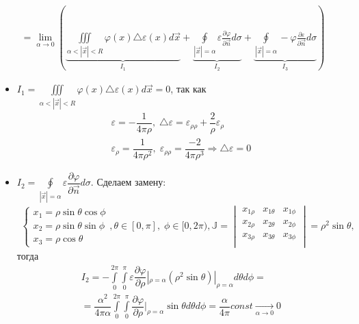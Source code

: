 \begin{Proof}
$$\begin{gathered}
		= \lim_{\alpha \to 0} \left(\underbrace{\iiint \limits_{\alpha < |\vec{x}| < R} \varphi (x) \triangle \varepsilon (x) d \vec{x}}_{I_1} + \underbrace{\oint \limits_{|\vec{x}| = \alpha} \varepsilon \frac{\partial \varphi}{\partial \vec{n}} d \sigma}_{I_2} + \underbrace{\oint \limits_{|\vec{x}| = \alpha}  -\varphi \frac{\partial \varepsilon}{\partial \vec{n}} d \sigma}_{I_3} \right)
	\end{gathered}$$
	\begin{itemize}
		\item $I_1 = \iiint \limits_{\alpha < |\vec{x}| < R} \varphi (x) \triangle \varepsilon (x) d \vec{x} = 0$, так как 
		$$\begin{gathered}
			\varepsilon = -\dfrac{1}{4\pi \rho}, \; \triangle\varepsilon = \varepsilon_{\rho\rho} + \dfrac{2}{\rho}\varepsilon_{\rho} \\
			\varepsilon_{\rho} = \dfrac{1}{4\pi\rho^2}, \; \varepsilon_{\rho\rho} = \dfrac{-2}{4\pi\rho^3} \Longrightarrow \triangle\varepsilon = 0
		\end{gathered}$$
		\item $I_2 = \oint \limits_{|\vec{x}| = \alpha} \varepsilon \dfrac{\partial \varphi}{\partial \vec{n}}d\sigma $. Сделаем замену:
		$$\begin{gathered}
			\begin{cases}		
				x_1 = \rho \sin\theta\cos\phi \\	
				x_2 = \rho \sin\theta\sin\phi \\	
				x_3 = \rho \cos\theta
			\end{cases},  \theta \in [0, \pi], \; \phi \in [0, 2\pi), 
			\mathbb{J} = 
			\begin{vmatrix}
				x_{1\rho} & x_{1\theta} & x_{1\phi}  \\
				x_{2\rho} & x_{2\theta} & x_{2\phi}  \\
				x_{3\rho} & x_{3\theta} & x_{3\phi}  \\
			\end{vmatrix} =
			\rho^2\sin\theta,
		\end{gathered}$$
		тогда
		$$\begin{gathered}
			I_2 = -\int\limits_{0}^{2\pi} \int\limits_{0}^{\pi} \varepsilon \dfrac{\partial \varphi}{\partial \rho}|_{\rho = \alpha}(\rho^2\sin\theta)
			|_{\rho = \alpha} d\theta d\phi = \\
			= \dfrac{\alpha^2}{4\pi\alpha} \int\limits_{0}^{2\pi} \int\limits_{0}^{\pi}  \dfrac{\partial \varphi}{\partial \rho}|_{\rho = \alpha}\sin\theta
			d\theta d\phi = \dfrac{\alpha}{4\pi} const \underset{\alpha \rightarrow 0}{\longrightarrow} 0

\end{gathered}$$
\end{itemize}
\end{Proof}

